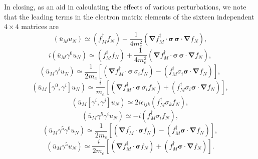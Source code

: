In closing, as an aid in calculating the effects of various perturbations, we
note that the leading terms in the electron matrix elements of the sixteen
independent $4\times4$ matrices are
\begin{equation}
 (\bar u_Mu_N)\simeq(f_M^\dagger f_N)
 -\frac1{4m_e^2}(\boldsymbol\nabla f_M^\dagger\cdot\boldsymbol\sigma\,
 \boldsymbol\sigma\cdot\boldsymbol\nabla f_N),
 \tag{14.1.40}\label{eq:14.1.40}
\end{equation}
\begin{equation}
 i(\bar u_M\gamma^0u_N)\simeq(f_M^\dagger f_N)
 +\frac1{4m_e^2}(\boldsymbol\nabla f_M^\dagger\cdot\boldsymbol\sigma\,
 \boldsymbol\sigma\cdot\boldsymbol\nabla f_N),
 \tag{14.1.41}\label{eq:14.1.41}
\end{equation}
\begin{equation}
 (\bar u_M\gamma^iu_N)\simeq\frac1{2m_e}
 \left[(\boldsymbol\nabla f_M^\dagger\cdot\boldsymbol\sigma\,\sigma_i f_N)
 -(f_M^\dagger\sigma_i\boldsymbol\sigma\cdot\boldsymbol\nabla f_N)\right],
 \tag{14.1.42}\label{eq:14.1.42}
\end{equation}
\begin{equation}
 (\bar u_M[\gamma^0,\gamma^i]u_N)\simeq\frac{i}{m_e}
 \left[(\boldsymbol\nabla f_M^\dagger\cdot\boldsymbol\sigma\,\sigma_i f_N)
 +(f_M^\dagger\sigma_i\boldsymbol\sigma\cdot\boldsymbol\nabla f_N)\right],
 \tag{14.1.43}\label{eq:14.1.43}
\end{equation}
\begin{equation}
 (\bar u_M[\gamma^i,\gamma^j]u_N)\simeq
 2i\epsilon_{ijk}(f_M^\dagger\sigma_kf_N),
 \tag{14.1.44}\label{eq:14.1.44}
\end{equation}
\begin{equation}
 (\bar u_M\gamma^5\gamma^iu_N)\simeq-i(f_M^\dagger\sigma_if_N),
 \tag{14.1.45}\label{eq:14.1.45}
\end{equation}
\begin{equation}
 (\bar u_M\gamma^5\gamma^0u_N)\simeq\frac1{2m_e}
 \left[(\boldsymbol\nabla f_M^\dagger\cdot\boldsymbol\sigma f_N)
 -(f_M^\dagger\boldsymbol\sigma\cdot\boldsymbol\nabla f_N)\right],
 \tag{14.1.46}\label{eq:14.1.46}
\end{equation}
\begin{equation}
 (\bar u_M\gamma^5u_N)\simeq\frac{i}{2m_e}
 \left[(\boldsymbol\nabla f_M^\dagger\cdot\boldsymbol\sigma f_N)
 +(f_M^\dagger\boldsymbol\sigma\cdot\boldsymbol\nabla f_N)\right].
 \tag{14.1.47}\label{eq:14.1.47}
\end{equation}
